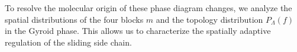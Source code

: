 To resolve the molecular origin of these phase diagram changes, we analyze the spatial distributions of the four blocks $m$ and the topology distribution $P_\Lambda(f)$ in the Gyroid phase.
This allows us to characterize the spatially adaptive regulation of the sliding side chain.
